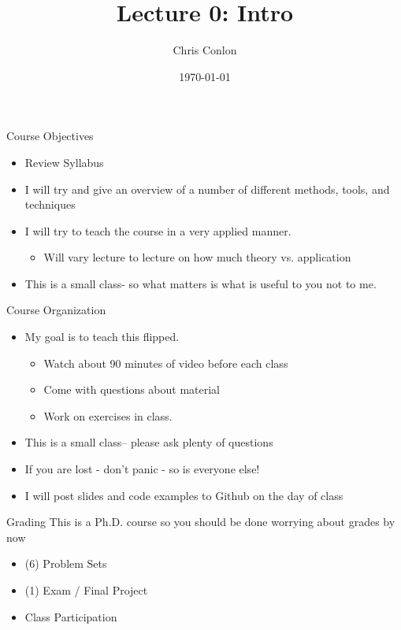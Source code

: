 \documentclass[aspectratio=169]{beamer}
\title{Lecture 0: Intro}
\author{Chris Conlon }
\institute{NYU Stern }
\date{\today}
\begin{document}
\maketitle

\begin{frame}[fragile]{Course Objectives}
\begin{itemize}
\item Review Syllabus
\item I will try and give an overview of a number of different methods, tools, and techniques
\item I will try to teach the course in a very \alert{applied} manner.
\begin{itemize}
\item Will vary lecture to lecture on how much theory vs. application
\end{itemize} 
\item This is a small class- so what matters is what is useful to \alert{you} not to me.
\end{itemize} 
\end{frame}


\begin{frame}[fragile]{Course Organization}
\begin{itemize}
\item My goal is to teach this \alert{flipped}.
\begin{itemize}
\item Watch about 90 minutes of video before each class
\item Come with questions about material
\item Work on exercises in class.
\end{itemize}

\item This is a small class-- please ask plenty of questions
\item If you are lost - don't panic - so is everyone else!
\item I will post slides and code examples to Github on the day of class
\end{itemize} 
\end{frame}

\begin{frame}[fragile]{Grading}
This is a Ph.D. course so you should be done worrying about grades by now
\begin{itemize}
\item (6) Problem Sets
\item (1) Exam / Final Project
\item Class Participation
\end{itemize} 
\end{frame}
\end{document}
